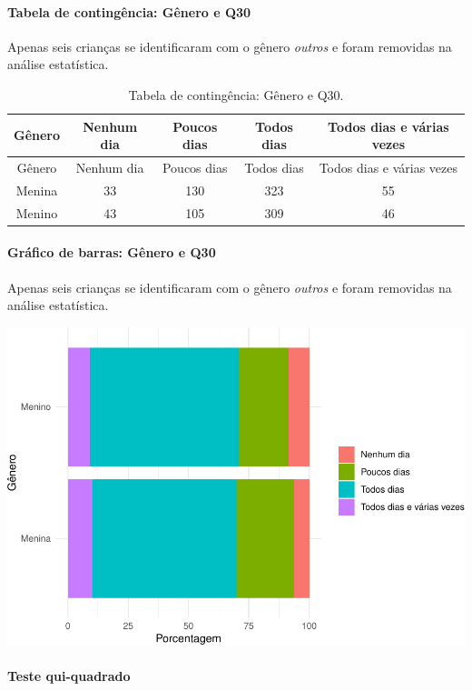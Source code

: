 \documentclass[]{article}
\let\oldparagraph\paragraph
\renewcommand{\paragraph}[1]{\oldparagraph{#1}\mbox{}}
\begin{document}
\cleardoublepage

\hypertarget{tabela-de-continguxeancia-guxeanero-e-q30}{%
\paragraph{Tabela de contingência: Gênero e Q30}\label{tabela-de-continguxeancia-guxeanero-e-q30}}

Apenas seis crianças se identificaram com o gênero \emph{outros} e foram removidas na análise estatística.

\begin{longtable}[]{@{}ccccc@{}}
\caption{\label{tab:unnamed-chunk-967}Tabela de contingência: Gênero e Q30.}\tabularnewline
\toprule
Gênero & Nenhum dia & Poucos dias & Todos dias & Todos dias e várias vezes\tabularnewline
\midrule
\endfirsthead
\toprule
Gênero & Nenhum dia & Poucos dias & Todos dias & Todos dias e várias vezes\tabularnewline
\midrule
\endhead
Menina & 33 & 130 & 323 & 55\tabularnewline
Menino & 43 & 105 & 309 & 46\tabularnewline
\bottomrule
\end{longtable}

\hypertarget{gruxe1fico-de-barras-guxeanero-e-q30}{%
\paragraph{Gráfico de barras: Gênero e Q30}\label{gruxe1fico-de-barras-guxeanero-e-q30}}

Apenas seis crianças se identificaram com o gênero \emph{outros} e foram removidas na análise estatística.

\begin{center}\includegraphics[width=0.75\linewidth]{relatorio_covid19_files/figure-latex/unnamed-chunk-968-1} \end{center}

\hypertarget{teste-qui-quadrado-83}{%
\paragraph{Teste qui-quadrado}\label{teste-qui-quadrado-83}}
\end{document}
